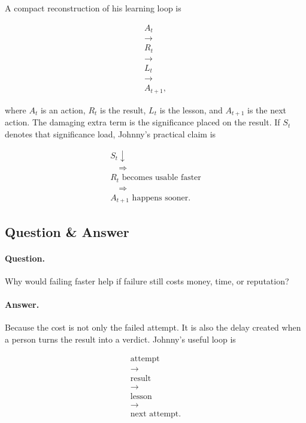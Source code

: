 \documentclass[11pt,oneside]{book}
\begin{document}
A compact reconstruction of his learning loop is

\begin{equation}
\begin{gathered}
A_t\\
\longrightarrow\\
R_t\\
\longrightarrow\\
L_t\\
\longrightarrow\\
A_{t+1},
\end{gathered}
\end{equation}

where \(A_t\) is an action, \(R_t\) is the result, \(L_t\) is the lesson, and \(A_{t+1}\) is the next action. The damaging extra term is the significance placed on the result. If \(S_t\) denotes that significance load, Johnny's practical claim is

\begin{equation}
\begin{gathered}
S_t \downarrow\\
\quad \Longrightarrow \quad\\
R_t \text{ becomes usable faster}\\
\quad \Longrightarrow \quad\\
A_{t+1} \text{ happens sooner}.
\end{gathered}
\end{equation}

\subsection{Question \& Answer}

\paragraph{Question.}
Why would failing faster help if failure still costs money, time, or reputation?

\paragraph{Answer.}
Because the cost is not only the failed attempt. It is also the delay created when a person turns the result into a verdict. Johnny's useful loop is

\begin{equation}
\begin{gathered}
\text{attempt}\\
\rightarrow\\
\text{result}\\
\rightarrow\\
\text{lesson}\\
\rightarrow\\
\text{next attempt}.
\end{gathered}
\end{equation}
\end{document}
